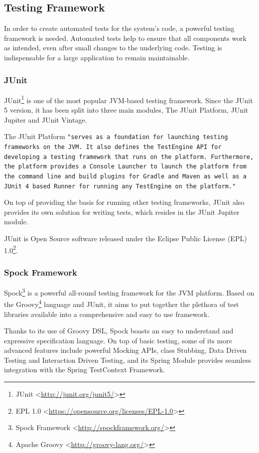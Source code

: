\subsection{Testing Framework}
In order to create automated tests for the system's code, a powerful testing framework is needed. Automated tests help to ensure that all components work as intended, even after small changes to the underlying code. Testing is indispensable for a large application to remain maintainable.

\subsubsection{JUnit}
JUnit\footnote{JUnit <\url{http://junit.org/junit5/}>} is one of the most popular JVM-based testing framework. Since the JUnit 5 version, it has been split into three main modules, The JUnit Platform, JUnit Jupiter and JUnit Vintage.

The JUnit Platform \texttt{"serves as a foundation for launching testing frameworks on the JVM. It also defines the TestEngine API for developing a testing framework that runs on the platform. Furthermore, the platform provides a Console Launcher to launch the platform from the command line and build plugins for Gradle and Maven as well as a JUnit 4 based Runner for running any TestEngine on the platform."}\cite{junit}

On top of providing the basis for running other testing frameworks, JUnit also provides its own solution for writing tests, which resides in the JUnit Jupiter module.

JUnit is Open Source software released under the Eclipse Public License (EPL) 1.0\footnote{EPL 1.0 <\url{https://opensource.org/licenses/EPL-1.0}>}.

\subsubsection{Spock Framework}
Spock\footnote{Spock Framework <\url{http://spockframework.org/}>} is a powerful all-round testing framework for the JVM platform. Based on the Groovy\footnote{Apache Groovy <\url{http://groovy-lang.org/}>} language and JUnit, it aims to put together the plethora of test libraries available into a comprehensive and easy to use framework. 

Thanks to its use of Groovy DSL, Spock boasts an easy to understand and expressive specification language. On top of basic testing, some of its more advanced features include powerful Mocking APIs, class Stubbing, Data Driven Testing and Interaction Driven Testing, and its Spring Module provides seamless integration with the Spring TestContext Framework\cite{spock}.

